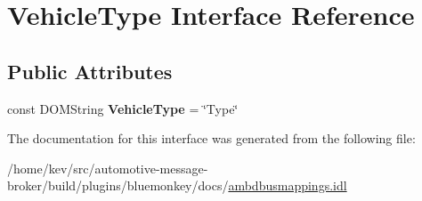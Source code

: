 \hypertarget{interfaceVehicleType}{\section{Vehicle\+Type Interface Reference}
\label{interfaceVehicleType}
}
\subsection*{Public Attributes}
\begin{DoxyCompactItemize}
\item 
\hypertarget{interfaceVehicleType_a281e3242c227956a5497d0b1dd685cc6}{const D\+O\+M\+String {\bfseries Vehicle\+Type} = \char`\"{}Type\char`\"{}}\label{interfaceVehicleType_a281e3242c227956a5497d0b1dd685cc6}

\end{DoxyCompactItemize}


The documentation for this interface was generated from the following file\+:\begin{DoxyCompactItemize}
\item 
/home/kev/src/automotive-\/message-\/broker/build/plugins/bluemonkey/docs/\hyperlink{ambdbusmappings_8idl}{ambdbusmappings.\+idl}\end{DoxyCompactItemize}

